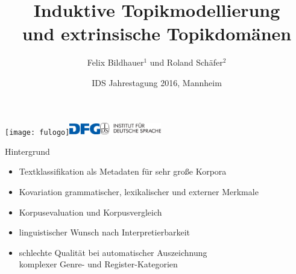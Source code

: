 \documentclass{beamer}
\title[Topikmodellierung und -domänen]{Induktive Topikmodellierung\\und extrinsische Topikdomänen}
\author[Felix Bildhauer, Roland Schäfer]{Felix Bildhauer$^1$ und Roland Schäfer$^2$}
\institute[]{$^1$Abt.\ Grammatik IDS Mannheim, $^2$Ling.\ Webcharakterisierung (DFG) FU Berlin}
\date[]{IDS Jahrestagung 2016, Mannheim}
\begin{document}

\begin{frame}
\texttt{[image: fulogo]}\hspace{0.05\textwidth}\includegraphics[width=0.10\textwidth]{dfglogo}\hspace{0.4
\textwidth}\includegraphics[width=0.2\textwidth]{idslogo}
  \maketitle
\end{frame}



\begin{frame}
  {Hintergrund}
  \begin{itemize}
    \item \alert{Textklassifikation} als \alert{Metadaten} für sehr große Korpora
    \item \alert{Kovariation} grammatischer, lexikalischer und externer Merkmale
    \item \alert{Korpusevaluation} und Korpusvergleich\\
      \citep{Kilgarriff2001,BiemannEa2013,SchaeferBildhauer2013de}
      \vspace{0.5cm}
    \item linguistischer Wunsch nach \alert{Interpretierbarkeit}
      \vspace{0.5cm}
    \item schlechte Qualität bei automatischer Auszeichnung\\
      komplexer Genre- und Register-Kategorien \citep{BiberEgbert2016}
  \end{itemize}
\end{frame}
\end{document}
